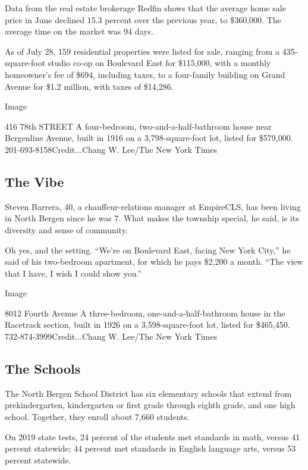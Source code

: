 Data from the real estate brokerage Redfin shows that the average home
sale price in June declined 15.3 percent over the previous year, to
\$360,000. The average time on the market was 94 days.

As of July 28, 159 residential properties were listed for sale, ranging
from a 435-square-foot studio co-op on Boulevard East for \$115,000,
with a monthly homeowner's fee of \$694, including taxes, to a
four-family building on Grand Avenue for \$1.2 million, with taxes of
\$14,286.

Image

416 78th STREET \textbar{} A four-bedroom, two-and-a-half-bathroom house
near Bergenline Avenue, built in 1916 on a 3,798-square-foot lot, listed
for \$579,000. 201-693-8158Credit...Chang W. Lee/The New York Times

\hypertarget{the-vibe}{%
\subsection{The Vibe}\label{the-vibe}}

Steven Barrera, 40, a chauffeur-relations manager at EmpireCLS, has been
living in North Bergen since he was 7. What makes the township special,
he said, is its diversity and sense of community.

Oh yes, and the setting. ``We're on Boulevard East, facing New York
City,'' he said of his two-bedroom apartment, for which he pays \$2,200
a month. ``The view that I have, I wish I could show you.''

Image

8012 Fourth Avenue \textbar{} A three-bedroom, one-and-a-half-bathroom
house in the Racetrack section, built in 1926 on a 3,598-square-foot
lot, listed for \$465,450. 732-874-3999Credit...Chang W. Lee/The New
York Times

\hypertarget{the-schools}{%
\subsection{The Schools}\label{the-schools}}

The North Bergen School District has six elementary schools that extend
from prekindergarten, kindergarten or first grade through eighth grade,
and one high school. Together, they enroll about 7,660 students.

On 2019 state tests, 24 percent of the students met standards in math,
versus 41 percent statewide; 44 percent met standards in English
language arts, versus 53 percent statewide.

